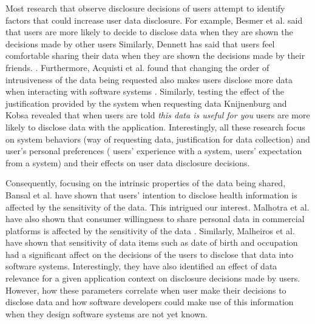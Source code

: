 \documentclass[conference]{IEEEtran}
\begin{document}
Most research that observe disclosure decisions of users attempt to identify factors that could increase user data disclosure. For example, Besmer et al. said that users are more likely to decide to disclose data when they are shown the decisions made by other users \cite {besmer2010impact} Similarly, Dennett has said that users feel comfortable sharing their data when they are shown the decisions made by their friends. \cite {dennett2000little}. Furthermore, Acquisti et al. found that changing the order of intrusiveness of the data being requested also makes users disclose more data when interacting with software systems \cite {acquisti2012impact}. Similarly, testing the effect of the justification provided by the system when requesting data Knijnenburg and Kobsa \cite {knijnenburg2013helping} revealed that when users are told \textit{this data is useful for you} users are more likely to disclose data with the application. Interestingly, all these research focus on system behaviors (way of requesting data, justification for data collection) and user's personal preferences ( users' experience with a system, users' expectation from a system) and their effects on user data disclosure decisions.

Consequently, focusing on the intrinsic properties of the data being shared, Bansal et al. have shown that users' intention to disclose health information is affected by the sensitivity of the data\cite {bansal2010impact}. This intrigued our interest. Malhotra et al. have also shown that consumer willingness to share personal data in commercial platforms is affected by the sensitivity of the data \cite {malhotra2004internet}. Similarly, Malheiros et al. \cite {malheiros2013fairly} have shown that sensitivity of data items such as date of birth and occupation had a significant affect on the decisions of the users to disclose that data into software systems. Interestingly, they have also identified an effect of data relevance for a given application context on disclosure decisions made by users. However, how these parameters correlate when user make their decisions to disclose data and how software developers could make use of this information when they design software systems are not yet known.
\end{document}
